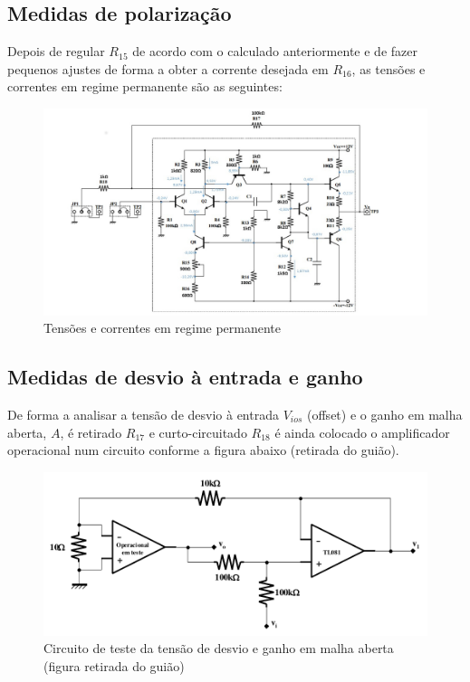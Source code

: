 \documentclass[a4paper]{article}
\begin{document}
    \subsection{Medidas de polarização}
        \medskip
        Depois de regular $R_{15}$ de acordo com o calculado anteriormente e de fazer pequenos ajustes de forma a obter a corrente desejada em $R_{16}$, as tensões e correntes em regime permanente são as seguintes:
        \begin{figure}[H]
            \centering
            \includegraphics[width=\textwidth]{figura3_tensoesCorrentesDC.jpg}
            \caption{\label{fig:tensoesCorrentesDC}Tensões e correntes em regime permanente}
        \end{figure}
        \smallskip
    
    \subsection{Medidas de desvio à entrada e ganho}
        \bigskip
        De forma a analisar a tensão de desvio à entrada $V_{ios}$ (offset) e o ganho em malha aberta, $A$, é retirado $R_{17}$ e curto-circuitado $R_{18}$ é ainda colocado o amplificador operacional num circuito conforme a figura abaixo (retirada do guião).
        \begin{figure}[H]
            \centering
            \includegraphics[width=\textwidth]{figura4_circuitoTeste.png}
            \caption{\label{fig:cicuitoTeste}Circuito de teste da tensão de desvio e ganho em malha aberta (figura retirada do guião)}
        \end{figure}
        \medskip
        
\end{document}
